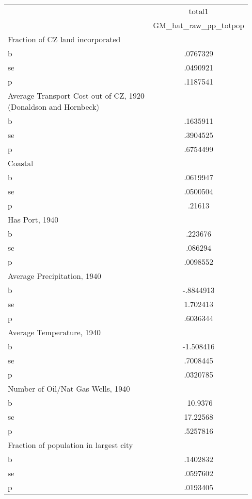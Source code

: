 \begin{tabular}{l*{1}{c}}
\toprule
                &   total1\\
                &GM\_hat\_raw\_pp\_totpop\\
\midrule
Fraction of CZ land incorporated&         \\
b               & .0767329\\
se              & .0490921\\
p               & .1187541\\
\midrule
Average Transport Cost out of CZ, 1920 (Donaldson and Hornbeck)&         \\
b               & .1635911\\
se              & .3904525\\
p               & .6754499\\
\midrule
Coastal         &         \\
b               & .0619947\\
se              & .0500504\\
p               &   .21613\\
\midrule
Has Port, 1940  &         \\
b               &  .223676\\
se              &  .086294\\
p               & .0098552\\
\midrule
Average Precipitation, 1940&         \\
b               &-.8844913\\
se              & 1.702413\\
p               & .6036344\\
\midrule
Average Temperature, 1940&         \\
b               &-1.508416\\
se              & .7008445\\
p               & .0320785\\
\midrule
Number of Oil/Nat Gas Wells, 1940&         \\
b               & -10.9376\\
se              & 17.22568\\
p               & .5257816\\
\midrule
Fraction of population in largest city&         \\
b               & .1402832\\
se              & .0597602\\
p               & .0193405\\

\end{tabular}
